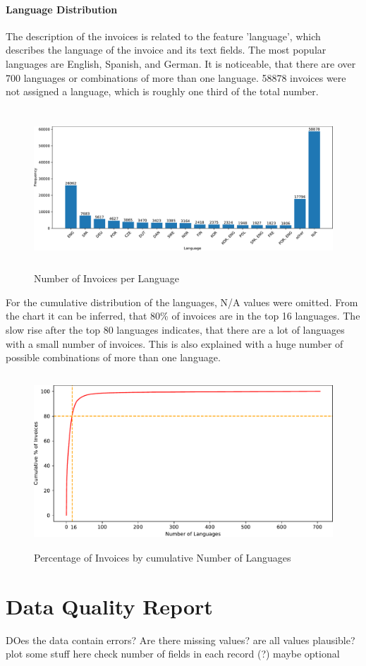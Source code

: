 \paragraph{Language Distribution}
The description of the invoices is related to the feature 'language', which describes the language of the invoice and its text fields. The most popular languages are English, Spanish, and German. It is noticeable, that there are over 700 languages or combinations of more than one language. 58878 invoices were not assigned a language, which is roughly one third of the total number.
\begin{figure}[ht]
	\centering
	\includegraphics[height=6cm]{Bilder/languages.pdf}
	\caption{Number of Invoices per Language}
	\label{fig:languages-bar}
\end{figure}

For the cumulative distribution of the languages, N/A values were omitted. From the chart it can be inferred, that 80\% of invoices are in the top 16 languages. The slow rise after the top 80 languages indicates, that there are a lot of languages with a small number of invoices. This is also explained with a huge number of possible combinations of more than one language.
\begin{figure}[ht]
	\centering
	\includegraphics[height=6.5cm]{Bilder/languages_pareto.pdf}
	\caption{Percentage of Invoices by cumulative Number of Languages}
	\label{fig:languages-bar}
\end{figure}


\section{Data Quality Report}
DOes the data contain errors?
Are there missing values?
are all values plausible?
plot some stuff here
check number of fields in each record (?) maybe optional
